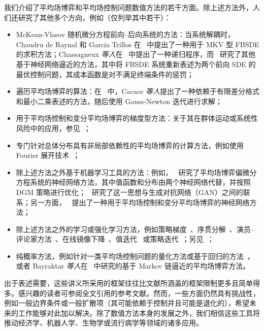\documentclass{amsproc}
\theoremstyle{definition}
\theoremstyle{remark}
\numberwithin{equation}{section}
\begin{document}
我们介绍了平均场博弈和平均场控制问题数值方法的若干方面。除上述方法外，人们还研究了其他多个方向，例如（仅列举其中若干）：
\begin{itemize}
	\item McKean-Vlasov 随机微分方程前向--后向系统的方法：当系统解耦时，Chaudru de Raynal 和 Garcia Trillos 在~\cite{MR3322862} 中提出了一种用于 MKV 型 FBSDE 的求积方法；Chassagneux \textit{等人}在~\cite{MR3914553,Angiulietal-2019} 中提出了一种递归程序，而~\cite{fouque2019deep,carmona2019convergence2,germain2019numerical} 研究了其他基于神经网络逼近的方法，其中将 FBSDE 系统重新表述为两个前向 SDE 的最优控制问题，其成本函数是对不满足终端条件的惩罚；
	\item 遍历平均场博弈的算法：在~\cite{MR3601001,MR3882530} 中，Cacace \textit{等人}提出了一种依赖于有限差分格式和最小二乘表述的方法，随后使用 Gauss-Newton 迭代进行求解； 
	\item 用于平均场控制和变分平均场博弈的梯度型方法：关于其在群体运动或系统性风险中的应用，参见~\cite{LachapelleWolfram-2011-MFG-congestion-aversion, MR3501391,MR3619691}；
	\item 专门针对总体分布具有非局部依赖性的平均场博弈的计算方法，例如使用 Fourier 展开技术~\cite{nurbekyan2019fourier}；
	\item 除上述方法之外基于机器学习工具的方法：例如，~\cite{al2018solving,carmona2019convergence1} 研究了平均场博弈偏微分方程系统的神经网络方法，其中值函数和分布由两个神经网络代替，并按照 DGM 策略进行优化；~\cite{cao2020connecting} 研究了这一思想与生成对抗网络（GAN）之间的联系；另一方面，~\cite{ruthotto2020machine} 提出了一种用于平均场控制和变分平均场博弈的神经网络方法；
	\item 除上述方法之外的学习或强化学习方法，例如策略梯度~\cite{subramanianpolicy}、序贯分解~\cite{mishra2020model}、演员--评论家方法~\cite{fu2019actor}、在线镜像下降~\cite{Hadikhanloo-phdthesis}、值迭代~\cite{anahtarci2019value} 或策略迭代~\cite{cacacecamilligoffi2020policy}；另见~\cite{tembine2012meanfieldlearning}；
	\item 纯概率方法，例如针对一类平均场控制问题的量化方法或基于回归的方法~\cite{balata2019class}，或者 Bayraktar \textit{等人}在~\cite{MR3873029} 中研究的基于 Markov 链逼近的平均场博弈方法。
\end{itemize}

出于表述需要，这些讲义所采用的框架往往比文献所涵盖的框架限制更多且简单得多。感兴趣的读者可参阅全文引用的参考文献。然而，一些方面仍然具有挑战性，例如一般边界条件或一般扩散项（其可能依赖于控制并且可能是退化的），希望未来的工作能够对此加以解决。除了数值方法本身的发展之外，我们相信这些工具将推动经济学、机器人学、生物学或流行病学等领域的诸多应用。
\end{document}
